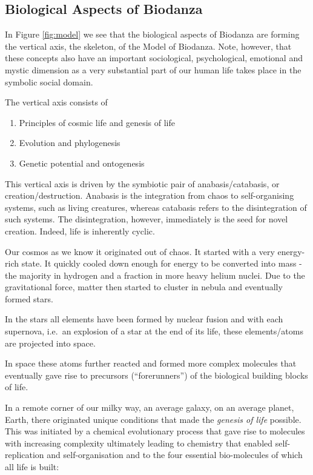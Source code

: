\documentclass[
  11pt,
]{book}
\providecommand{\tightlist}{%
  \setlength{\itemsep}{0pt}\setlength{\parskip}{0pt}}
\begin{document}
\hypertarget{biological-aspects-of-biodanza}{%
\subsection{Biological Aspects of Biodanza}\label{biological-aspects-of-biodanza}}

In Figure \ref{fig:model} we see that the biological aspects of Biodanza are forming the vertical axis, the skeleton, of the Model of Biodanza. Note, however, that these concepts also have an important sociological, psychological, emotional and mystic dimension as a very substantial part of our human life takes place in the symbolic social domain.

The vertical axis consists of

\begin{enumerate}
\def\labelenumi{\arabic{enumi}.}
\tightlist
\item
  Principles of cosmic life and genesis of life
\item
  Evolution and phylogenesis
\item
  Genetic potential and ontogenesis
\end{enumerate}

This vertical axis is driven by the symbiotic pair of anabasis/catabasis, or creation/destruction. Anabasis is the integration from chaos to self-organising systems, such as living creatures, whereas catabasis refers to the disintegration of such systems. The disintegration, however, immediately is the seed for novel creation. Indeed, life is inherently cyclic.

Our cosmos as we know it originated out of chaos. It started with a very energy-rich state. It quickly cooled down enough for energy to be converted into mass - the majority in hydrogen and a fraction in more heavy helium nuclei. Due to the gravitational force, matter then started to cluster in nebula and eventually formed stars.

In the stars all elements have been formed by nuclear fusion and with each supernova, i.e.~an explosion of a star at the end of its life, these elements/atoms are projected into space.

In space these atoms further reacted and formed more complex molecules that eventually gave rise to precursors (``forerunners'') of the biological building blocks of life.

In a remote corner of our milky way, an average galaxy, on an average planet, Earth, there originated unique conditions that made the \emph{genesis of life} possible.
This was initiated by a chemical evolutionary process that gave rise to molecules with increasing complexity ultimately leading to chemistry that enabled self-replication and self-organisation and to the four essential bio-molecules of which all life is built:
\end{document}

